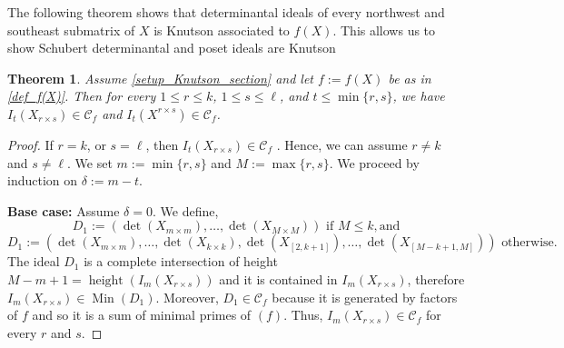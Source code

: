 \documentclass[12pt]{amsart}
\renewcommand{\leq}{\leqslant}
\newtheorem{theorem}{Theorem}[section]
\theoremstyle{definition}
\renewcommand{\(}{\left(}
\renewcommand{\)}{\right)}
\newcommand{\height}{\operatorname{height}}
\newcommand{\deta}[1]{\operatorname{det}\left( {#1} \right)}
\renewcommand{\!}[1]{{\color{red}\text{\Huge$\star$ }#1}}
\newcommand{\ls}{\leqslant}%
\newcommand{\MIN}{\operatorname{Min}}
\begin{document}
The following theorem shows that determinantal ideals of every northwest and southeast submatrix of $X$ is Knutson associated to $f(X)$. This allows us to show Schubert determinantal and poset ideals are Knutson

\begin{theorem}\label{p:msk}
	Assume \autoref{setup_Knutson_section} and  let $f:=f(X) $ be as in \autoref{def_f(X)}.  Then for every $1\ls r \ls k$, $1\ls s\ls \ell$, and $t\ls \min\{r,s\}$, we have $I_t(X_{r\times s})\in \mathcal{C}_f$ and $I_t(X^{r\times s}) \in \mathcal{C}_f$.
\end{theorem}

\begin{proof}
	If $r=k$, or $s=\ell$, then $I_t(X_{r\times s}) \in \mathcal{C}_f$ \cite[Lemma 2.2]{seccia2022knutson}. Hence, we can assume   $r\neq k$ and $s \neq \ell$. We set $m:=\min\{r,s\}$ and $M:=\max\{r,s\}$.  %
	We proceed by induction on $\delta:=m-t$.
	
	{\bf Base case:} Assume $\delta=0$. We define, 
	$$D_1:=\left( \deta{X_{m \times m}}, \ldots,\deta{X_{M \times M}}\right)\text{ if }M\ls k, \text{and}$$
	$$D_1:=\left( \deta{X_{m \times m}}, \ldots,\deta{X_{k \times k}}, \deta{X_{[2,k+1]}},\ldots, \deta{X_{[M-k+1,M]}} \right) \text{ otherwise}.$$
The ideal $D_1$ is a complete intersection of  height  $M-m+1=\height\left(I_m(X_{r \times s})\right)$ and it  is contained in $I_m(X_{r \times s})$, therefore $I_m(X_{r \times s}) \in \MIN( D_1).$  
Moreover, $D_1 \in \mathcal{C}_f$ because it is generated by factors of $f$ and so it is a sum of minimal primes of $(f)$.  Thus,  $I_m(X_{r \times s})\in \mathcal{C}_f$ for every $r$ and $s$.


\end{proof}
\end{document}
